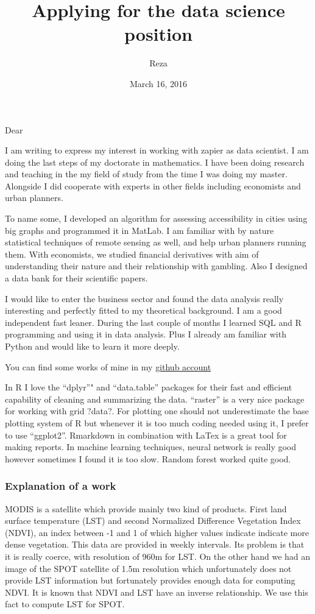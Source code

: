 \documentclass[]{article}
\title{Applying for the data science position}
\author{Reza}
\date{March 16, 2016}
\begin{document}
\maketitle


Dear

I am writing to express my interest in working with zapier as data
scientist. I am doing the last steps of my doctorate in mathematics. I
have been doing research and teaching in the my field of study from the
time I was doing my master. Alongside I did cooperate with experts in
other fields including economists and urban planners.

To name some, I developed an algorithm for assessing accessibility in
cities using big graphs and programmed it in MatLab. I am familiar with
by nature statistical techniques of remote sensing as well, and help
urban planners running them. With economists, we studied financial
derivatives with aim of understanding their nature and their
relationship with gambling. Also I designed a data bank for their
scientific papers.

I would like to enter the business sector and found the data analysis
really interesting and perfectly fitted to my theoretical background. I
am a good independent fast leaner. During the last couple of months I
learned SQL and R programming and using it in data analysis. Plus I
already am familiar with Python and would like to learn it more deeply.

You can find some works of mine in my \href{github.com/srhumir}{github
account}

In R I love the ``dplyr''" and ``data.table'' packages for their fast
and efficient capability of cleaning and summarizing the data.
``raster'' is a very nice package for working with grid ?data?. For
plotting one should not underestimate the base plotting system of R but
whenever it is too much coding needed using it, I prefer to use
``ggplot2''. Rmarkdown in combination with LaTex is a great tool for
making reports. In machine learning techniques, neural network is really
good however sometimes I found it is too slow. Random forest worked
quite good.

\subsubsection{Explanation of a work}\label{explanation-of-a-work}

MODIS is a satellite which provide mainly two kind of products. First
land surface temperature (LST) and second Normalized Difference
Vegetation Index (NDVI), an index between -1 and 1 of which higher
values indicate indicate more dense vegetation. This data are provided
in weekly intervals. Its problem is that it is really coerce, with
resolution of 960m for LST. On the other hand we had an image of the
SPOT satellite of 1.5m resolution which unfortunately does not provide
LST information but fortunately provides enough data for computing NDVI.
It is known that NDVI and LST have an inverse relationship. We use this
fact to compute LST for SPOT.
\end{document}
